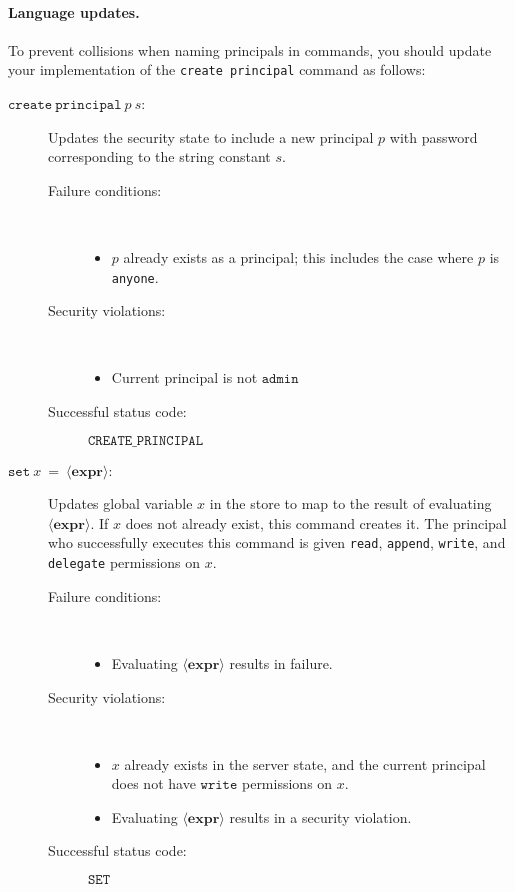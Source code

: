 \documentclass[11pt]{article}
\begin{document}
\paragraph{Language updates.}
To prevent collisions when naming principals in commands, you should update your implementation of the \texttt{create principal} command as follows:
\begin{description}
\item[$\mathtt{create\ principal}\ \mathit{p}\ \mathit{s}$:] Updates the security state to include a new principal $p$ with password corresponding to the string constant $s$.
\begin{description}
\item[Failure conditions:]\ \\[-1.5em]
\begin{itemize}
\item $p$ already exists as a principal; this includes the case where $p$ is \texttt{anyone}.
\end{itemize}
\item[Security violations:]\ \\[-1.5em]
\begin{itemize}
\item Current principal is not $\mathtt{admin}$
\end{itemize}
\item[Successful status code:] $\mathtt{CREATE\_PRINCIPAL}$
\end{description}
\end{description}

\begin{description}
\item[$\mathtt{set}\ \mathit{x}\ =\ \langle\mathbf{expr}\rangle$:] Updates global variable $x$ in the store to map to the result of evaluating $\langle\mathbf{expr}\rangle$. If $x$ does not already exist, this command creates it. The principal who successfully executes this command is given \texttt{read}, \texttt{append}, \texttt{write}, and \texttt{delegate} permissions on $x$.
\begin{description}
\item[Failure conditions:]\ \\[-1.5em]
\begin{itemize}
\item Evaluating $\langle\mathbf{expr}\rangle$ results in failure.
\end{itemize}
\item[Security violations:]\ \\[-1.5em]
\begin{itemize}
\item $x$ already exists in the server state, and the current principal does not have $\mathtt{write}$ permissions on $x$.
\item Evaluating $\langle\mathbf{expr}\rangle$ results in a security violation.
\end{itemize}
\item[Successful status code:] $\mathtt{SET}$
\end{description}
\end{description}
\end{document}
